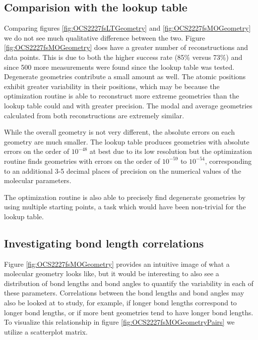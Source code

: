 
\subsection{Comparision with the lookup table}
Comparing figures \ref{fig:OCS2227fsLTGeometry} and \ref{fig:OCS2227fsMOGeometry} we do not see much qualitative difference between the two. Figure \ref{fig:OCS2227fsMOGeometry} does have a greater number of reconstructions and data points. This is due to both the higher success rate (85\% versus 73\%) and since 500 more measurements were found since the lookup table was tested. Degenerate geometries contribute a small amount as well. The atomic positions exhibit greater variability in their positions, which may be because the optimization routine is able to reconstruct more extreme geometries than the lookup table could and with greater precision. The modal and average geometries calculated from both reconstructions are extremely similar.

While the overall geometry is not very different, the absolute errors on each geometry are much smaller. The lookup table produces geometries with absolute errors on the order of $10^{-48}$ at best due to its low resolution but the optimization routine finds geometries with errors on the order of $10^{-59}$ to $10^{-54}$, corresponding to an additional 3-5 decimal places of precision on the numerical values of the molecular parameters.

The optimization routine is also able to precisely find degenerate geometries by using multiple starting points, a task which would have been non-trivial for the lookup table.

\subsection{Investigating bond length correlations} \label{ssec:weirdBonds}
Figure \ref{fig:OCS2227fsMOGeometry} provides an intuitive image of what a molecular geometry looks like, but it would be interesting to also see a distribution of bond lengths and bond angles to quantify the variability in each of these parameters. Correlations between the bond lengths and bond angles may also be looked at to study, for example, if longer  bond lengths correspond to longer  bond lengths, or if more bent geometries tend to have longer bond lengths. To visualize this relationship in figure \ref{fig:OCS2227fsMOGeometryPairs} we utilize a scatterplot matrix.

